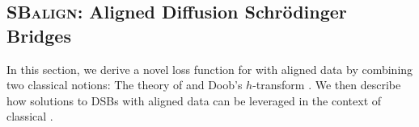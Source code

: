 
%

\subsection{\textsc{SBalign}: Aligned Diffusion Schr\"odinger Bridges}

In this section, we derive a novel loss function for  with aligned data by combining two classical notions: The theory of  \citep{schrodinger1931umkehrung,leonard2013survey,chen2021stochastic} and Doob's $h$-transform \citep{doob1984classical, rogers2000diffusions}. We then describe how solutions to DSBs with aligned data can be leveraged in the context of classical .


